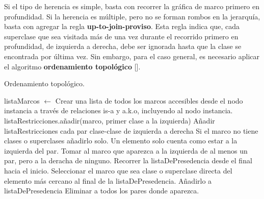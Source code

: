 Si el tipo de herencia es simple, basta con recorrer la gráfica de marco primero en profundidad.  Si la herencia es múltiple, pero no se forman rombos en la jerarquía, basta con agregar la regla \textbf{up-to-join-proviso}.  Esta regla indica que, cada superclase que sea visitada más de una vez durante el recorrido primero en profundidad, de izquierda a derecha, debe ser ignorada hasta que la clase se encontrada por última vez.  Sin embargo, para el caso general, es necesario aplicar el algoritmo \textbf{ordenamiento topológico} [].


\begin{algorithm}[H]
 \caption{Ordenamiento topológico.}\label{alg:topological_sort}
\begin{algorithmic}
 \State listaMarcos $\leftarrow$ Crear una lista de todos los marcos accesibles desde el nodo instancia a través de relaciones is-a y a.k.o, incluyendo al nodo instancia.
  \State listaRestricciones.añadir(marco, primer clase a la izquierda)
  \State Añadir listaRestricciones cada par clase-clase de izquierda a derecha
  \State Si el marco no tiene clases o superclases añadirlo solo.  Un elemento solo cuenta como estar a la izquierda del par.
 \EndFor
 \Repeat
 \State Tomar al marco que aparezca a la izquierda de al menos un par, pero a la deracha de ninguno.
   \State Recorrer la listaDePresedencia desde el final hacia el inicio.
   \State Seleccionar el marco que sea clase o superclase directa del elemento más cercano al final de la listaDePresedencia.
  \EndIf
  \State Añadirlo a listaDePresedencia
  \State Eliminar a todos los pares donde aparezca.
\end{algorithmic}
\end{algorithm}

